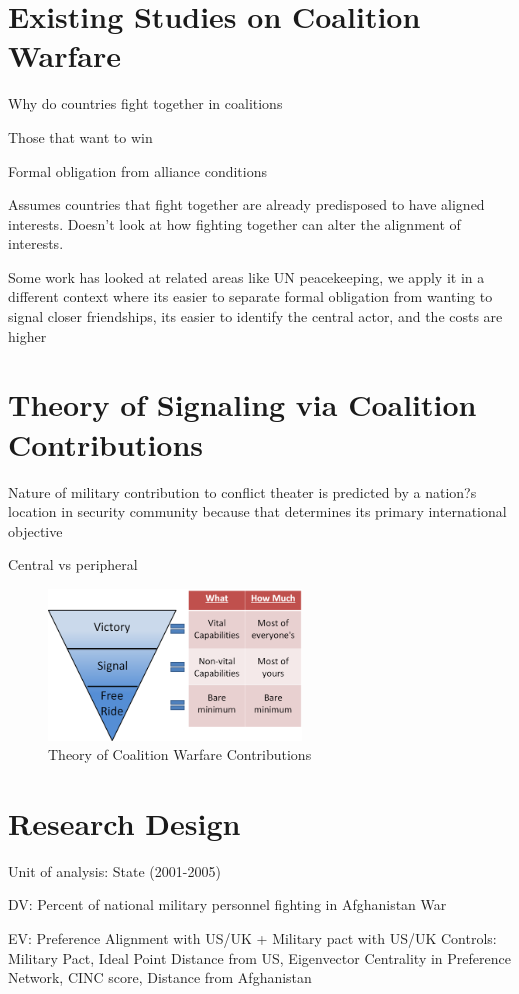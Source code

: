 \documentclass[12pt,letterpaper]{article}
\begin{document}
\section{Existing Studies on Coalition Warfare}
Why do countries fight together in coalitions

Those that want to win

Formal obligation from alliance conditions

Assumes countries that fight together are already predisposed to have aligned interests. Doesn't look at how fighting together can alter the alignment of interests.

Some work has looked at related areas like UN peacekeeping, we apply it in a different context where its easier to separate formal obligation from wanting to signal closer friendships, its easier to identify the central actor, and the costs are higher

\section{Theory of Signaling via Coalition Contributions}
Nature of military contribution to conflict theater is predicted by a nation?s location in security community because that determines its primary international objective

Central vs peripheral
	\begin{figure}[H]
		\centering
		\includegraphics[width=0.6\textwidth]{contribution_pyramid.png}
		\caption{Theory of Coalition Warfare Contributions}
		\label{fig:theory}
	\end{figure}			

\section{Research Design}
Unit of analysis: State (2001-2005)

DV: Percent of national military personnel fighting in Afghanistan War

EV: Preference Alignment with US/UK + Military pact with US/UK
Controls: Military Pact, Ideal Point Distance from US,  Eigenvector Centrality in Preference Network, CINC score, Distance from Afghanistan
\end{document}
